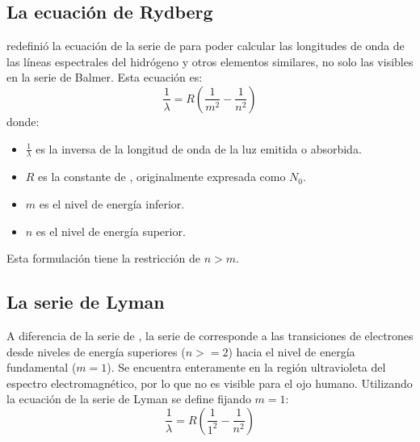 \documentclass[11pt,a4paper,spanish]{book}
\begin{document}
\subsection{La ecuación de Rydberg}
\citet{rydberg1890} redefinió la ecuación de la serie de \citet{balmer1885} para
poder calcular las longitudes de onda de las líneas espectrales del hidrógeno
y otros elementos similares, no solo las visibles en la serie de
Balmer. Esta ecuación es:
\begin{equation}
  \frac{1}{\lambda} = R \left(\frac{1}{m^2} - \frac{1}{n^2}\right)
\end{equation}
donde:
\begin{itemize}[nosep]
  \item $\frac{1}{\lambda}$ es la inversa de la longitud de onda de
    la luz emitida o absorbida.
  \item $R$ es la constante de \citet{rydberg1890}, originalmente
    expresada como $N_0$.
  \item $m$ es el nivel de energía inferior.
  \item $n$ es el nivel de energía superior.
\end{itemize}
\vspace{8pt}
Esta formulación tiene la restricción de $n > m$.

\subsection{La serie de Lyman}
A diferencia de la serie de \citet{balmer1885}, la serie de
\citet{lyman1906} corresponde a las transiciones
de electrones desde niveles de energía superiores ($n >= 2$) hacia el
nivel de energía fundamental ($m = 1$). Se encuentra
enteramente en la región ultravioleta del espectro electromagnético,
por lo que no es visible para el ojo humano. Utilizando
la ecuación de \citet{rydberg1890} la serie de Lyman se define fijando $m = 1$:
\begin{equation}
  \frac{1}{\lambda} = R \left(\frac{1}{1^2} - \frac{1}{n^2}\right)
\end{equation}
\end{document}
